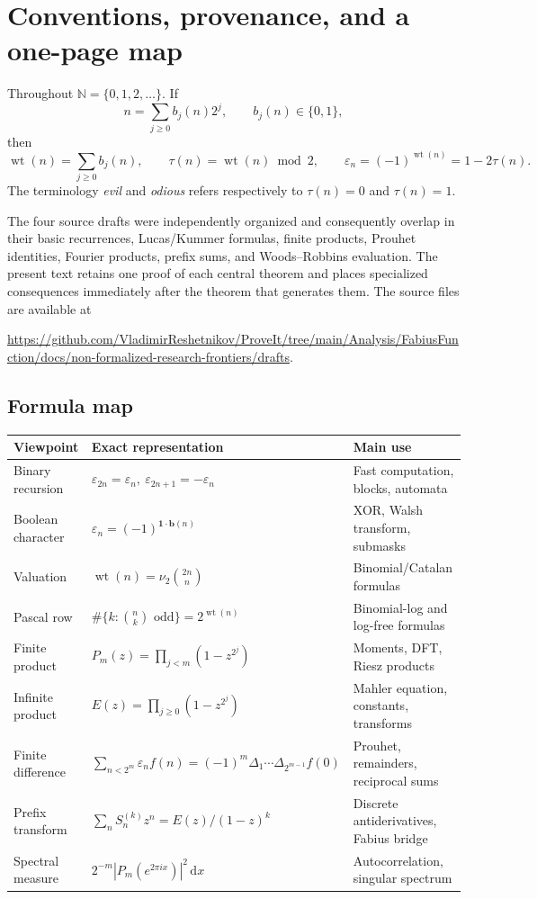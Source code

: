 \documentclass[11pt,oneside]{article}
\numberwithin{equation}{section}
\theoremstyle{definition}
\theoremstyle{remark}
\newcommand{\N}{\mathbb N}
\newcommand{\wt}{\operatorname{wt}}
\newcommand{\vtwo}{\nu_2}
\newcommand{\eps}{\varepsilon}
\newcommand{\TM}{\tau}
\newcommand{\dd}{\,\mathrm d}
\begin{document}
\tableofcontents
\clearpage
{}

\section{Conventions, provenance, and a one-page map}
\label{sec:conventions}

Throughout \(\N=\{0,1,2,\ldots\}\).  If
\[
 n=\sum_{j\ge0}b_j(n)2^j,\qquad b_j(n)\in\{0,1\},
\]
then
\begin{equation}
 \wt(n)=\sum_{j\ge0}b_j(n),\qquad
 \TM(n)=\wt(n)\bmod2,\qquad
 \eps_n=(-1)^{\wt(n)}=1-2\TM(n).
 \label{eq:definitions}
\end{equation}
The terminology \emph{evil} and \emph{odious} refers respectively to
\(\TM(n)=0\) and \(\TM(n)=1\).

The four source drafts were independently organized and consequently overlap
in their basic recurrences, Lucas/Kummer formulas, finite products, Prouhet
identities, Fourier products, prefix sums, and Woods--Robbins evaluation.  The
present text retains one proof of each central theorem and places specialized
consequences immediately after the theorem that generates them.  The source
files are available at
\begin{center}
\url{https://github.com/VladimirReshetnikov/ProveIt/tree/main/Analysis/FabiusFunction/docs/non-formalized-research-frontiers/drafts}.
\end{center}

\subsection{Formula map}

\begin{longtable}{@{}p{}p{}p{}@{}}
\toprule
Viewpoint & Exact representation & Main use \\
\midrule
\endhead
Binary recursion & \(\eps_{2n}=\eps_n,\ \eps_{2n+1}=-\eps_n\) & Fast computation, blocks, automata \\
Boolean character & \(\eps_n=(-1)^{\bm1\cdot\bm b(n)}\) & XOR, Walsh transform, submasks \\
Valuation & \(\wt(n)=\vtwo\binom{2n}{n}\) & Binomial/Catalan formulas \\
Pascal row & \(\#\{k:\binom nk\text{ odd}\}=2^{\wt(n)}\) & Binomial-log and log-free formulas \\
Finite product & \(P_m(z)=\prod_{j<m}(1-z^{2^j})\) & Moments, DFT, Riesz products \\
Infinite product & \(E(z)=\prod_{j\ge0}(1-z^{2^j})\) & Mahler equation, constants, transforms \\
Finite difference & \(\sum_{n<2^m}\eps_nf(n)=(-1)^m\Delta_1\cdots\Delta_{2^{m-1}}f(0)\) & Prouhet, remainders, reciprocal sums \\
Prefix transform & \(\sum_nS_n^{(k)}z^n=E(z)/(1-z)^k\) & Discrete antiderivatives, Fabius bridge \\
Spectral measure & \(2^{-m}|P_m(e^{2\pi ix})|^2\dd x\) & Autocorrelation, singular spectrum \\
\bottomrule
\end{longtable}
\end{document}
